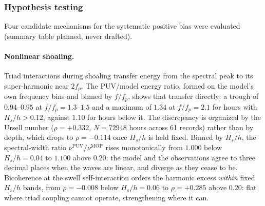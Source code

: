 \subsubsection{Hypothesis testing}


Four candidate mechanisms for the systematic positive bias were evaluated
(summary table planned, never drafted).

\paragraph{Nonlinear shoaling.}
Triad interactions during shoaling transfer energy from the spectral peak to its
super-harmonic near $2f_p$. The PUV/model energy ratio, formed on the model's
own frequency bins and binned by $f/f_p$, shows that transfer directly: a trough
of $0.94$--$0.95$ at $f/f_p = 1.3$--$1.5$ and a maximum of $1.34$ at
$f/f_p = 2.1$ for hours with $H_s/h > 0.12$, against $1.10$ for hours below it.
The discrepancy is organized by the Ursell number
($\rho = +0.332$, $N = \num{72948}$ hours across 61 records) rather than by
depth, which drops to $\rho = -0.114$ once $H_s/h$ is held fixed. Binned by
$H_s/h$, the spectral-width ratio $\nu^\text{PUV}/\nu^\text{MOP}$ rises
monotonically from $1.000$ below $H_s/h = 0.04$ to $1.100$ above $0.20$: the
model and the observations agree to three decimal places when the waves are
linear, and diverge as they cease to be. Bicoherence at the swell
self-interaction orders the harmonic excess \emph{within} fixed $H_s/h$ bands,
from $\rho = -0.008$ below $H_s/h = 0.06$ to $\rho = +0.285$ above $0.20$:
flat where triad coupling cannot operate, strengthening where it can.

